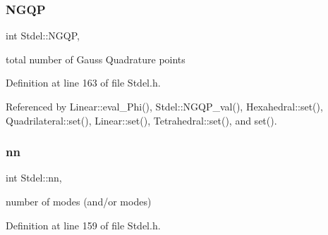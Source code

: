\mbox{\label{classStdel_aa3cff31280606cd3eb95af770dd6f5b4}} 
\subsubsection{\texorpdfstring{N\+G\+QP}{NGQP}}
{\footnotesize\ttfamily int Stdel\+::\+N\+G\+QP\hspace{0.3cm}{\ttfamily [protected]}, {\ttfamily [inherited]}}



total number of Gauss Quadrature points 



Definition at line 163 of file Stdel.\+h.



Referenced by Linear\+::eval\+\_\+\+Phi(), Stdel\+::\+N\+G\+Q\+P\+\_\+val(), Hexahedral\+::set(), Quadrilateral\+::set(), Linear\+::set(), Tetrahedral\+::set(), and set().

\mbox{\label{classStdel_af4d02765d362e2f0469633ff78734f89}} 
\subsubsection{\texorpdfstring{nn}{nn}}
{\footnotesize\ttfamily int Stdel\+::nn\hspace{0.3cm}{\ttfamily [protected]}, {\ttfamily [inherited]}}



number of modes (and/or modes) 



Definition at line 159 of file Stdel.\+h.



